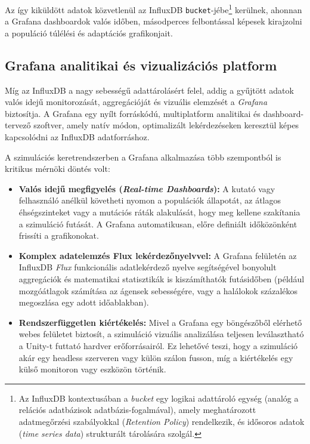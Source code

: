Az így kiküldött adatok közvetlenül az InfluxDB \texttt{bucket}-jébe\footnote{Az InfluxDB kontextusában a \textit{bucket} egy logikai adattároló egység (analóg a relációs adatbázisok adatbázis-fogalmával), amely meghatározott adatmegőrzési szabályokkal (\textit{Retention Policy}) rendelkezik, és idősoros adatok (\textit{time series data}) strukturált tárolására szolgál.} kerülnek, ahonnan a Grafana dashboardok valós időben, másodperces felbontással képesek kirajzolni a populáció túlélési és adaptációs grafikonjait.

\subsection{Grafana analitikai és vizualizációs platform}

Míg az InfluxDB a nagy sebességű adattárolásért felel, addig a gyűjtött adatok valós idejű monitorozását, aggregációját és vizuális elemzését a \textit{Grafana} biztosítja. A Grafana egy nyílt forráskódú, multiplatform analitikai és dashboard-tervező szoftver, amely natív módon, optimalizált lekérdezéseken keresztül képes kapcsolódni az InfluxDB adatforráshoz.

A szimulációs keretrendszerben a Grafana alkalmazása több szempontból is kritikus mérnöki döntés volt:
\begin{itemize}
    \item \textbf{Valós idejű megfigyelés (\textit{Real-time Dashboards}):} A kutató vagy felhasználó anélkül követheti nyomon a populációk állapotát, az átlagos éhségszinteket vagy a mutációs ráták alakulását, hogy meg kellene szakítania a szimuláció futását. A Grafana automatikusan, előre definiált időközönként frissíti a grafikonokat.
    \item \textbf{Komplex adatelemzés Flux lekérdezőnyelvvel:} A Grafana felületén az InfluxDB \textit{Flux} funkcionális adatlekérdező nyelve segítségével bonyolult aggregációk és matematikai statisztikák is kiszámíthatók futásidőben (például mozgóátlagok számítása az ágensek sebességére, vagy a halálokok százalékos megoszlása egy adott időablakban).
    \item \textbf{Rendszerfüggetlen kiértékelés:} Mivel a Grafana egy böngészőből elérhető webes felületet biztosít, a szimuláció vizuális analizálása teljesen leválasztható a Unity-t futtató hardver erőforrásairól. Ez lehetővé teszi, hogy a szimuláció akár egy headless szerveren vagy külön szálon fusson, míg a kiértékelés egy külső monitoron vagy eszközön történik.
\end{itemize}